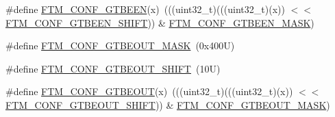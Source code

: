 \begin{DoxyCompactItemize}
\item 
\#define \mbox{\hyperlink{group___f_t_m___register___masks_gaf0c17ca25c72f05ea05fd8d375223d73}{F\+T\+M\+\_\+\+C\+O\+N\+F\+\_\+\+G\+T\+B\+E\+EN}}(x)~(((uint32\+\_\+t)(((uint32\+\_\+t)(x)) $<$$<$ \mbox{\hyperlink{group___f_t_m___register___masks_ga08e28bc089eeea68a240bb8e716172d8}{F\+T\+M\+\_\+\+C\+O\+N\+F\+\_\+\+G\+T\+B\+E\+E\+N\+\_\+\+S\+H\+I\+FT}})) \& \mbox{\hyperlink{group___f_t_m___register___masks_ga2ab518e33ed4bcb533a022f469c62994}{F\+T\+M\+\_\+\+C\+O\+N\+F\+\_\+\+G\+T\+B\+E\+E\+N\+\_\+\+M\+A\+SK}})
\item 
\#define \mbox{\hyperlink{group___f_t_m___register___masks_ga172965c1d295c0edcc7454a96bc03430}{F\+T\+M\+\_\+\+C\+O\+N\+F\+\_\+\+G\+T\+B\+E\+O\+U\+T\+\_\+\+M\+A\+SK}}~(0x400\+U)
\item 
\#define \mbox{\hyperlink{group___f_t_m___register___masks_gab3cdb8493cf40ad27cd27b513fc618ec}{F\+T\+M\+\_\+\+C\+O\+N\+F\+\_\+\+G\+T\+B\+E\+O\+U\+T\+\_\+\+S\+H\+I\+FT}}~(10\+U)
\item 
\#define \mbox{\hyperlink{group___f_t_m___register___masks_gaa14db924a3ea8dd3a08a9b0cdc670e3e}{F\+T\+M\+\_\+\+C\+O\+N\+F\+\_\+\+G\+T\+B\+E\+O\+UT}}(x)~(((uint32\+\_\+t)(((uint32\+\_\+t)(x)) $<$$<$ \mbox{\hyperlink{group___f_t_m___register___masks_gab3cdb8493cf40ad27cd27b513fc618ec}{F\+T\+M\+\_\+\+C\+O\+N\+F\+\_\+\+G\+T\+B\+E\+O\+U\+T\+\_\+\+S\+H\+I\+FT}})) \& \mbox{\hyperlink{group___f_t_m___register___masks_ga172965c1d295c0edcc7454a96bc03430}{F\+T\+M\+\_\+\+C\+O\+N\+F\+\_\+\+G\+T\+B\+E\+O\+U\+T\+\_\+\+M\+A\+SK}})
\end{DoxyCompactItemize}
